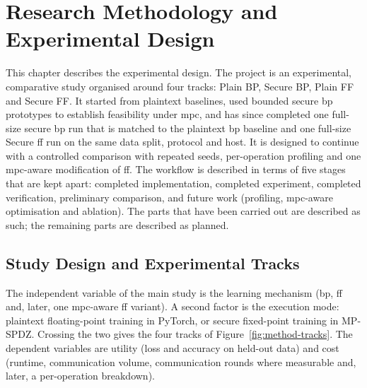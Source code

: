 \chapter{Research Methodology and Experimental Design}\label{chap:method}
\sloppy

This chapter describes the experimental design. The project is an experimental, comparative study organised around four tracks: Plain BP, Secure BP, Plain FF and Secure FF. It started from plaintext baselines, used bounded secure \ac{bp} prototypes to establish feasibility under \ac{mpc}, and has since completed one full-size secure \ac{bp} run that is matched to the plaintext \ac{bp} baseline and one full-size Secure \ac{ff} run on the same data split, protocol and host. It is designed to continue with a controlled comparison with repeated seeds, per-operation profiling and one \ac{mpc}-aware modification of \ac{ff}. The workflow is described in terms of five stages that are kept apart: completed implementation, completed experiment, completed verification, preliminary comparison, and future work (profiling, \ac{mpc}-aware optimisation and ablation). The parts that have been carried out are described as such; the remaining parts are described as planned.

\section{Study Design and Experimental Tracks}\label{sec:method-design}
The independent variable of the main study is the learning mechanism (\ac{bp}, \ac{ff} and, later, one \ac{mpc}-aware \ac{ff} variant). A second factor is the execution mode: plaintext floating-point training in PyTorch, or secure fixed-point training in MP-SPDZ. Crossing the two gives the four tracks of Figure~\ref{fig:method-tracks}. The dependent variables are utility (loss and accuracy on held-out data) and cost (runtime, communication volume, communication rounds where measurable and, later, a per-operation breakdown).

